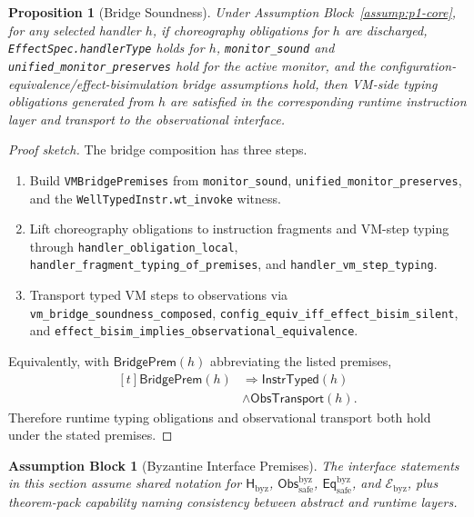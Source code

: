 \documentclass[a4paper,10pt,twocolumn,english]{article}
\numberwithin{equation}{section}
\theoremstyle{paperdef}
\theoremstyle{paperplain}
\newtheorem{proposition}[definition]{Proposition}
\theoremstyle{paperdef}
\newtheorem{assumption}{Assumption Block}[section]
\theoremstyle{paperremark}
\newcommand{\Hbyz}{\ensuremath{\mathsf{H}_{\mathrm{byz}}}}
\newcommand{\Obssafe}{\ensuremath{\mathsf{Obs}_{\mathrm{safe}}^{\mathrm{byz}}}}
\newcommand{\Eqsafe}{\ensuremath{\mathsf{Eq}_{\mathrm{safe}}^{\mathrm{byz}}}}
\newcommand{\Ebyz}{\ensuremath{\mathcal{E}_{\mathrm{byz}}}}
\begin{document}
\begin{proposition}[Bridge Soundness]
	\label{prop:bridge-soundness}
	Under Assumption Block~\ref{assump:p1-core}, for any selected handler $h$, if choreography obligations for $h$ are discharged, \texttt{EffectSpec.handlerType} holds for $h$, \nolinkurl{monitor_sound} and \nolinkurl{unified_monitor_preserves} hold for the active monitor, and the configuration-equivalence/effect-bisimulation bridge assumptions hold, then VM-side typing obligations generated from $h$ are satisfied in the corresponding runtime instruction layer and transport to the observational interface.
\end{proposition}

\begin{proof}[Proof sketch]
	The bridge composition has three steps.
	\begin{enumerate}
		\item Build \texttt{VMBridgePremises} from \nolinkurl{monitor_sound}, \nolinkurl{unified_monitor_preserves}, and the \nolinkurl{WellTypedInstr.wt_invoke} witness.
		\item Lift choreography obligations to instruction fragments and VM-step typing through \nolinkurl{handler_obligation_local}, \nolinkurl{handler_fragment_typing_of_premises}, and \nolinkurl{handler_vm_step_typing}.
		\item Transport typed VM steps to observations via \nolinkurl{vm_bridge_soundness_composed}, \nolinkurl{config_equiv_iff_effect_bisim_silent}, and \nolinkurl{effect_bisim_implies_observational_equivalence}.
	\end{enumerate}
	Equivalently, with $\mathsf{BridgePrem}(h)$ abbreviating the listed premises,
	\[
		\begin{aligned}[t]
			\mathsf{BridgePrem}(h)
			 & \Longrightarrow \mathsf{InstrTyped}(h) \\
			 & \land \mathsf{ObsTransport}(h).
		\end{aligned}
	\]
	Therefore runtime typing obligations and observational transport both hold under the stated premises.
\end{proof}

\begin{assumption}[Byzantine Interface Premises]
	\label{assump:p1-byzantine}
	The interface statements in this section assume shared notation for \Hbyz, \Obssafe, \Eqsafe, and \Ebyz, plus theorem-pack capability naming consistency between abstract and runtime layers.
\end{assumption}
\end{document}
